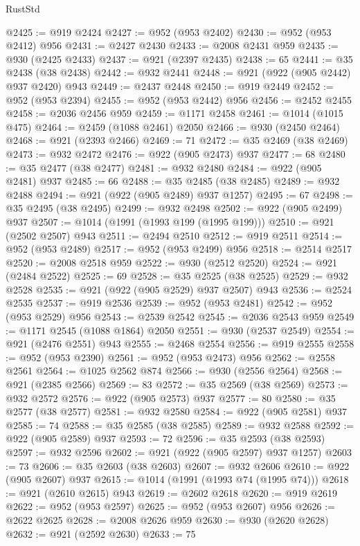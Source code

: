 \begin{lexlean}{RustStd}
\begin{coremodule}
@2425 := @919 @2424
@2427 := @952 (@953 @2402)
@2430 := @952 (@953 @2412) @956
@2431 := @2427 @2430
@2433 := @2008 @2431 @959
@2435 := @930 (@2425 @2433)
@2437 := @921 (@2397 @2435)
@2438 := 65
@2441 := @35 @2438 (@38 @2438)
@2442 := @932 @2441
@2448 := @921 (@922 (@905 @2442) @937 @2420) @943
@2449 := @2437 @2448
@2450 := @919 @2449
@2452 := @952 (@953 @2394)
@2455 := @952 (@953 @2442) @956
@2456 := @2452 @2455
@2458 := @2036 @2456 @959
@2459 := @1171 @2458
@2461 := @1014 (@1015 @475)
@2464 := @2459 (@1088 @2461) @2050
@2466 := @930 (@2450 @2464)
@2468 := @921 (@2393 @2466)
@2469 := 71
@2472 := @35 @2469 (@38 @2469)
@2473 := @932 @2472
@2476 := @922 (@905 @2473) @937
@2477 := 68
@2480 := @35 @2477 (@38 @2477)
@2481 := @932 @2480
@2484 := @922 (@905 @2481) @937
@2485 := 66
@2488 := @35 @2485 (@38 @2485)
@2489 := @932 @2488
@2494 := @921 (@922 (@905 @2489) @937 @1257)
@2495 := 67
@2498 := @35 @2495 (@38 @2495)
@2499 := @932 @2498
@2502 := @922 (@905 @2499) @937
@2507 := @1014 (@1991 (@1993 @199 (@1995 @199)))
@2510 := @921 (@2502 @2507) @943
@2511 := @2494 @2510
@2512 := @919 @2511
@2514 := @952 (@953 @2489)
@2517 := @952 (@953 @2499) @956
@2518 := @2514 @2517
@2520 := @2008 @2518 @959
@2522 := @930 (@2512 @2520)
@2524 := @921 (@2484 @2522)
@2525 := 69
@2528 := @35 @2525 (@38 @2525)
@2529 := @932 @2528
@2535 := @921 (@922 (@905 @2529) @937 @2507) @943
@2536 := @2524 @2535
@2537 := @919 @2536
@2539 := @952 (@953 @2481)
@2542 := @952 (@953 @2529) @956
@2543 := @2539 @2542
@2545 := @2036 @2543 @959
@2549 := @1171 @2545 (@1088 @1864) @2050
@2551 := @930 (@2537 @2549)
@2554 := @921 (@2476 @2551) @943
@2555 := @2468 @2554
@2556 := @919 @2555
@2558 := @952 (@953 @2390)
@2561 := @952 (@953 @2473) @956
@2562 := @2558 @2561
@2564 := @1025 @2562 @874
@2566 := @930 (@2556 @2564)
@2568 := @921 (@2385 @2566)
@2569 := 83
@2572 := @35 @2569 (@38 @2569)
@2573 := @932 @2572
@2576 := @922 (@905 @2573) @937
@2577 := 80
@2580 := @35 @2577 (@38 @2577)
@2581 := @932 @2580
@2584 := @922 (@905 @2581) @937
@2585 := 74
@2588 := @35 @2585 (@38 @2585)
@2589 := @932 @2588
@2592 := @922 (@905 @2589) @937
@2593 := 72
@2596 := @35 @2593 (@38 @2593)
@2597 := @932 @2596
@2602 := @921 (@922 (@905 @2597) @937 @1257)
@2603 := 73
@2606 := @35 @2603 (@38 @2603)
@2607 := @932 @2606
@2610 := @922 (@905 @2607) @937
@2615 := @1014 (@1991 (@1993 @74 (@1995 @74)))
@2618 := @921 (@2610 @2615) @943
@2619 := @2602 @2618
@2620 := @919 @2619
@2622 := @952 (@953 @2597)
@2625 := @952 (@953 @2607) @956
@2626 := @2622 @2625
@2628 := @2008 @2626 @959
@2630 := @930 (@2620 @2628)
@2632 := @921 (@2592 @2630)
@2633 := 75

\end{coremodule}
\end{lexlean}
